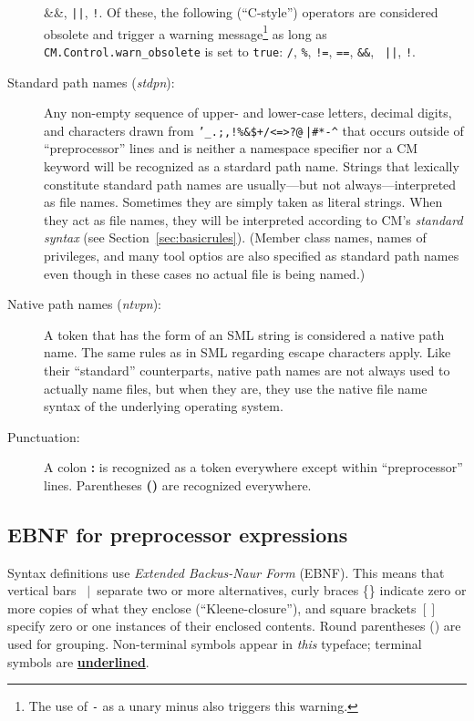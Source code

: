 \documentclass[titlepage,letterpaper]{article}
\newcommand{\nt}[1]{{\it #1}}
\newcommand{\tl}[1]{{\underline{\bf #1}}}
\newcommand{\vb}{~$|$~}
\begin{document}
\begin{description}
{\&\&}, {\tt ||}, {\tt !}.  Of these, the following (``C-style'')
operators are considered obsolete and trigger a warning
message\footnote{The use of {\tt -} as a unary minus also triggers
this warning.} as long as {\tt CM.Control.warn\_obsolete} is set to
{\tt true}: {\tt /}, {\tt \%}, {\tt !=}, {\tt ==}, {\tt \&\&}, {\tt
||}, {\tt !}.
\item[Standard path names (\nt{stdpn}):] Any non-empty sequence of
upper- and lower-case letters, decimal digits, and characters drawn
from {\tt '\_.;,!\%\&\$+/<=>?@$\tilde{~}$|\#*-\verb|^|} that occurs
outside of ``preprocessor'' lines and is neither a namespace specifier
nor a CM keyword will be recognized as a stardard path name.  Strings
that lexically constitute standard path names are usually---but not
always---interpreted as file names. Sometimes they are simply taken as
literal strings.  When they act as file names, they will be
interpreted according to CM's {\em standard syntax} (see
Section~\ref{sec:basicrules}).  (Member class names, names of
privileges, and many tool optios are also specified as standard path
names even though in these cases no actual file is being named.)
\item[Native path names (\nt{ntvpn}):] A token that has the form of an
SML string is considered a native path name.  The same rules as in SML
regarding escape characters apply.  Like their ``standard''
counterparts, native path names are not always used to actually name
files, but when they are, they use the native file name syntax of the
underlying operating system.
\item[Punctuation:] A colon {\bf :} is recognized as a token
everywhere except within ``preprocessor'' lines. Parentheses {\bf ()}
are recognized everywhere.
\end{description}

\subsection{EBNF for preprocessor expressions}

\/ Syntax definitions use {\em
Extended Backus-Naur Form} (EBNF).  This means that vertical bars
\vb separate two or more alternatives, curly braces \{\} indicate
zero or more copies of what they enclose (``Kleene-closure''), and
square brackets $[]$ specify zero or one instances of their enclosed
contents.  Round parentheses () are used for grouping.  Non-terminal
symbols appear in \nt{this}\/ typeface; terminal symbols are
\tl{underlined}.
\end{document}
